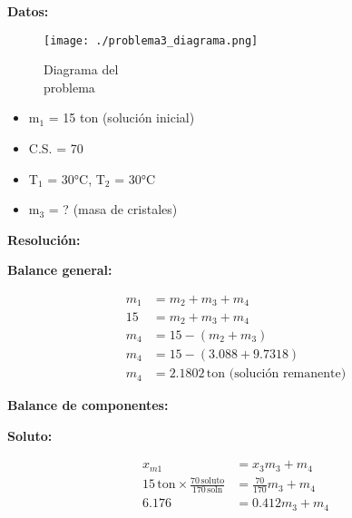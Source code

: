 \documentclass{article} %
\begin{document}
\begin{multicols}{2} %
\noindent\textbf{Datos:} %

\begin{figure}[H]
    \begin{minipage}[t]{0.3\textwidth} %
        \raggedright %
        \texttt{[image: ./problema3\_diagrama.png]} %
        \caption{Diagrama del \\ problema}
    \end{minipage}
\end{figure}

\textbf{} %
\begin{itemize}
\item m$_1$ = 15 ton (solución inicial)
\item C.S. = 70
\item T$_1$ = 30°C, T$_2$ = 30°C
\item m$_3$ = ? (masa de cristales)
\end{itemize}

\columnbreak %

\noindent\textbf{Resolución:} %

\textbf{Balance general:}

\begin{align*}
    m_1 &= m_2 + m_3 + m_4 \\[10pt]
    15 &= m_2 + m_3 + m_4 \\[10pt]
    m_4 &= 15 - (m_2 + m_3) \\[10pt]
    m_4 &= 15 - (3.088 + 9.7318) \\[10pt]
    m_4 &= 2.1802 \, \text{ton (solución remanente)}
\end{align*}

\textbf{Balance de componentes:}

\textbf{Soluto:}

\begin{align*}
    x_{m1} &= x_3 m_3 + m_4 \\[10pt]
    15 \, \text{ton} \times \frac{70 \, \text{soluto}}{170 \, \text{soln}} &= \frac{70}{170} m_3 + m_4 \\[10pt]
    6.176 &= 0.412 m_3 + m_4
\end{align*}


\end{multicols}
\end{document}
